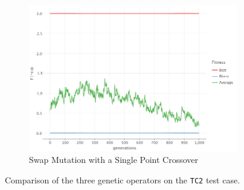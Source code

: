 \begin{figure}[ht!]
\begin{subfigure}{0.45\textwidth}
            \includegraphics[width=\textwidth]{img/beacon_sp_swap_2.png}
            \caption{Swap Mutation with a Single Point Crossover}
            \label{fig:beacon:2:swap}
        \end{subfigure}
        \caption{Comparison of the three genetic operators on the \texttt{TC2} test case.}
        \label{fig:beacon:2}
    \end{figure}

